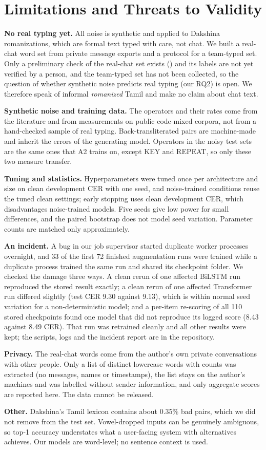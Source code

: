 \section{Limitations and Threats to Validity}
\label{sec:limits}
\textbf{No real typing yet.}
All noise is synthetic and applied to Dakshina romanizations, which are formal text typed with care, not chat.
We built a real-chat word set from private message exports and a protocol for a team-typed set.
Only a preliminary check of the real-chat set exists () and its labels are not yet verified by a person, and the team-typed set has not been collected, so the question of whether synthetic noise predicts real typing (our RQ2) is open.
We therefore speak of informal \emph{romanized} Tamil and make no claim about chat text.

\textbf{Synthetic noise and training data.}
The operators and their rates come from the literature and from measurements on public code-mixed corpora, not from a hand-checked sample of real typing.
Back-transliterated pairs are machine-made and inherit the errors of the generating model.
Operators in the noisy test sets are the same ones that A2 trains on, except KEY and REPEAT, so only these two measure transfer.

\textbf{Tuning and statistics.}
Hyperparameters were tuned once per architecture and size on clean development CER with one seed, and noise-trained conditions reuse the tuned clean settings; early stopping uses clean development CER, which disadvantages noise-trained models.
Five seeds give low power for small differences, and the paired bootstrap does not model seed variation.
Parameter counts are matched only approximately.

\textbf{An incident.}
A bug in our job supervisor started duplicate worker processes overnight, and 33 of the first 72 finished augmentation runs were trained while a duplicate process trained the same run and shared its checkpoint folder.
We checked the damage three ways.
A clean rerun of one affected BiLSTM run reproduced the stored result exactly; a clean rerun of one affected Transformer run differed slightly (test CER 9.30 against 9.13), which is within normal seed variation for a non-deterministic model; and a per-item re-scoring of all 110 stored checkpoints found one model that did not reproduce its logged score (8.43 against 8.49 CER).
That run was retrained cleanly and all other results were kept; the scripts, logs and the incident report are in the repository.

\textbf{Privacy.}
The real-chat words come from the author's own private conversations with other people.
Only a list of distinct lowercase words with counts was extracted (no messages, names or timestamps), the list stays on the author's machines and was labelled without sender information, and only aggregate scores are reported here.
The data cannot be released.

\textbf{Other.}
Dakshina's Tamil lexicon contains about 0.35\% bad pairs, which we did not remove from the test set.
Vowel-dropped inputs can be genuinely ambiguous, so top-1 accuracy understates what a user-facing system with alternatives achieves.
Our models are word-level; no sentence context is used.
